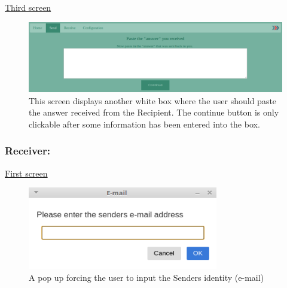 %
\noindent
\underline{Third screen}
\begin{figure}[H]
  \centering
  \includegraphics[width=\textwidth]{Figures/SL/sender_answer}
  \decoRule
  \caption[Input answer screen]{This screen displays another white box where the user should paste the answer received from the Recipient. The continue button is only clickable after some information has been entered into the box.}
  \label{fig:serv_s_ans}
\end{figure}

\subsubsection*{Receiver:}

%
\noindent
\underline{First screen}
\begin{figure}[H]
  \centering
  \includegraphics[width=\textwidth]{Figures/SL/receiver_pop_up}
  \decoRule
  \caption[Enter Sender screen]{A pop up forcing the user to input the Senders identity (e-mail)}
  \label{fig:serv_r_pop}
\end{figure}

